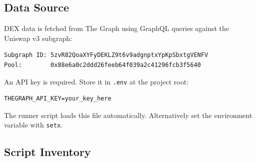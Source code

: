\documentclass[11pt,a4paper]{article}
\begin{document}
\subsection{Data Source}

DEX data is fetched from The Graph using GraphQL queries against the Uniswap v3 subgraph:
\begin{lstlisting}
Subgraph ID: 5zvR82QoaXYFyDEKLZ9t6v9adgnptxYpKpSbxtgVENFV
Pool:        0x88e6a0c2ddd26feeb64f039a2c41296fcb3f5640
\end{lstlisting}

An API key is required. Store it in \texttt{.env} at the project root:
\begin{lstlisting}
THEGRAPH_API_KEY=your_key_here
\end{lstlisting}
The runner script loads this file automatically. Alternatively set the environment variable with \texttt{setx}.

\subsection{Script Inventory}
\end{document}
